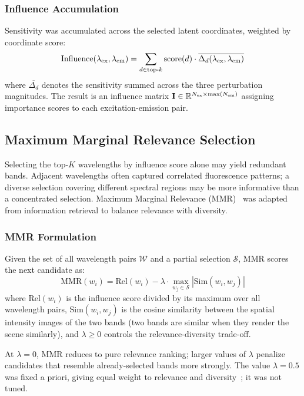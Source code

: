 \subsubsection{Influence Accumulation}
Sensitivity was accumulated across the selected latent coordinates, weighted by coordinate score:
\begin{equation}
\text{Influence}(\lambda_{\text{ex}}, \lambda_{\text{em}}) = \sum_{d \in \text{top-}k} \text{score}(d) \cdot \overline{\Delta_d(\lambda_{\text{ex}}, \lambda_{\text{em}})}
\label{eq:influence}
\end{equation}
where $\overline{\Delta_d}$ denotes the sensitivity summed across the three perturbation magnitudes.
The result is an influence matrix $\mathbf{I} \in \mathbb{R}^{N_{\text{ex}} \times \max(N_{\text{em}})}$ assigning importance scores to each excitation-emission pair.

\subsection{Maximum Marginal Relevance Selection}
\label{sec:mmr}

Selecting the top-$K$ wavelengths by influence score alone may yield redundant bands.
Adjacent wavelengths often captured correlated fluorescence patterns; a diverse selection covering different spectral regions may be more informative than a concentrated selection.
Maximum Marginal Relevance (MMR)~\cite{carbonell1998use} was adapted from information retrieval to balance relevance with diversity.

\subsubsection{MMR Formulation}
Given the set of all wavelength pairs $\mathcal{W}$ and a partial selection $\mathcal{S}$, MMR scores the next candidate as:
\begin{equation}
\text{MMR}(w_i) = \text{Rel}(w_i) - \lambda \cdot \max_{w_j \in \mathcal{S}} \left| \text{Sim}(w_i, w_j) \right|
\label{eq:mmr}
\end{equation}
where $\text{Rel}(w_i)$ is the influence score divided by its maximum over all wavelength pairs, $\text{Sim}(w_i, w_j)$ is the cosine similarity between the spatial intensity images of the two bands (two bands are similar when they render the scene similarly), and $\lambda \ge 0$ controls the relevance-diversity trade-off.

At $\lambda = 0$, MMR reduces to pure relevance ranking; larger values of $\lambda$ penalize candidates that resemble already-selected bands more strongly.
The value $\lambda = 0.5$ was fixed a priori, giving equal weight to relevance and diversity~\cite{carbonell1998use}; it was not tuned.

